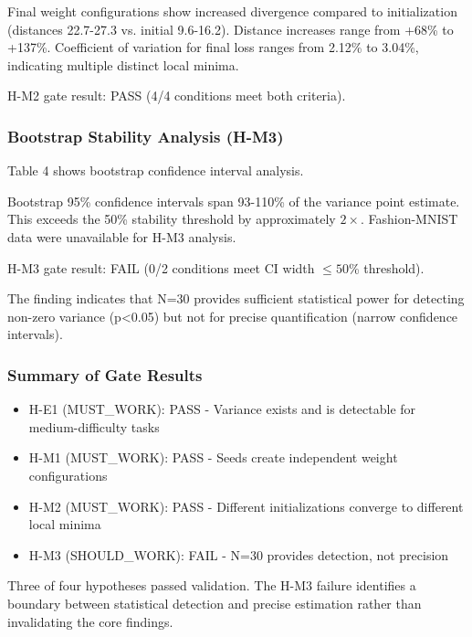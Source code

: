 Final weight configurations show increased divergence compared to initialization (distances 22.7-27.3 vs. initial 9.6-16.2). Distance increases range from +68\% to +137\%. Coefficient of variation for final loss ranges from 2.12\% to 3.04\%, indicating multiple distinct local minima.

H-M2 gate result: PASS (4/4 conditions meet both criteria).

\subsubsection{Bootstrap Stability Analysis (H-M3)}

Table 4 shows bootstrap confidence interval analysis.

\begin{table}[htbp]
\centering
{}
\end{table}

Bootstrap 95\% confidence intervals span 93-110\% of the variance point estimate. This exceeds the 50\% stability threshold by approximately $2\times$. Fashion-MNIST data were unavailable for H-M3 analysis.

H-M3 gate result: FAIL (0/2 conditions meet CI width $\leq 50$\% threshold).

The finding indicates that N=30 provides sufficient statistical power for detecting non-zero variance (p<0.05) but not for precise quantification (narrow confidence intervals).

\subsubsection{Summary of Gate Results}

\begin{itemize}
\item H-E1 (MUST\_WORK): PASS - Variance exists and is detectable for medium-difficulty tasks
\item H-M1 (MUST\_WORK): PASS - Seeds create independent weight configurations
\item H-M2 (MUST\_WORK): PASS - Different initializations converge to different local minima
\item H-M3 (SHOULD\_WORK): FAIL - N=30 provides detection, not precision
\end{itemize}

Three of four hypotheses passed validation. The H-M3 failure identifies a boundary between statistical detection and precise estimation rather than invalidating the core findings.
